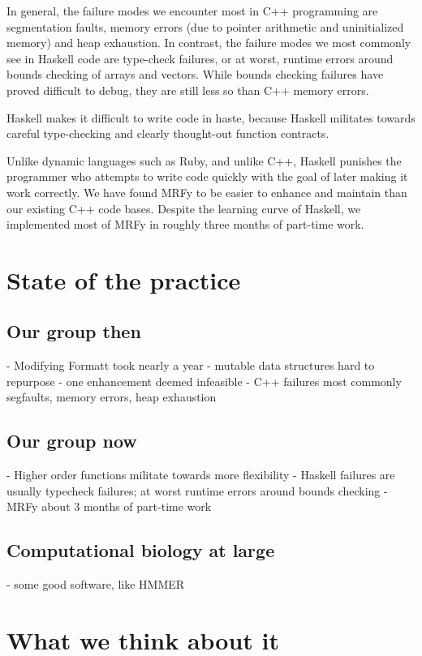 \documentclass[preprint,nonatbib,blockstyle,nocopyrightspace,times]{sigplanconf}
\begin{document}
In general, the failure modes we encounter most in C++ programming are 
segmentation faults, memory errors (due to pointer arithmetic and uninitialized 
memory) and heap exhaustion.
In contrast, the failure modes we most commonly 
see in Haskell code are type-check failures, or at worst, runtime errors around 
bounds checking of arrays and vectors.
While bounds checking failures have 
proved difficult to debug, they are still less so than C++ memory errors.


Haskell makes it difficult to write code in haste, because Haskell militates 
towards careful type-checking and clearly thought-out function contracts.

Unlike dynamic languages such as Ruby, and unlike C++, Haskell punishes the 
programmer who attempts to write code quickly with the goal of later making it 
work correctly.
We have found MRFy to be easier to enhance and maintain than 
our existing C++ code bases.
Despite the learning curve of Haskell, we 
implemented most of MRFy in roughly three months of part-time work.

 
\section{State of the practice}

\subsection{Our group then}
 - Modifying Formatt took nearly a year
 - mutable data structures hard to repurpose
 - one enhancement deemed infeasible
 - C++ failures most commonly segfaults, memory errors, heap exhaustion

\subsection{Our group now}
 - Higher order functions militate towards more flexibility
 - Haskell failures are usually typecheck failures; at worst runtime errors around bounds checking
 - MRFy about 3 months of part-time work

\subsection{Computational biology at large}
 - some good software, like HMMER

\section{What we think about it}
\end{document}
